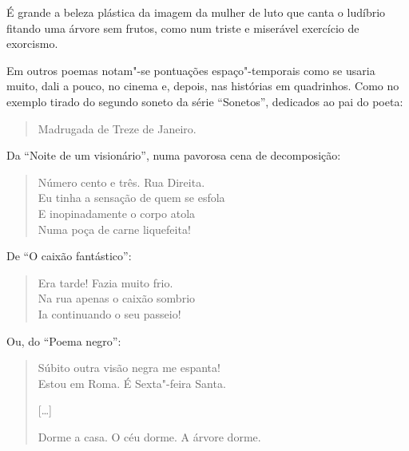 É grande a beleza plástica da imagem da mulher de luto que canta o
ludíbrio fitando uma árvore sem frutos, como num triste e miserável
exercício de exorcismo.

Em outros poemas notam"-se pontuações espaço"-temporais como se usaria muito, 
dali a pouco, no cinema e, depois, nas histórias em quadrinhos.
Como no exemplo tirado do segundo soneto da série “Sonetos”, dedicados
ao pai do poeta: 

\begin{verse}
Madrugada de Treze de Janeiro.
\end{verse}

Da “Noite de um visionário”, numa pavorosa cena de decomposição:

\begin{verse}
Número cento e três. Rua Direita.\\
Eu tinha a sensação de quem se esfola\\
E inopinadamente o corpo atola\\
Numa poça de carne liquefeita!
\end{verse}

De “O caixão fantástico”:

\begin{verse}
Era tarde! Fazia muito frio.\\
Na rua apenas o caixão sombrio\\
Ia continuando o seu passeio!
\end{verse}

Ou, do “Poema negro”:

\begin{verse}
Súbito outra visão negra me espanta!\\
Estou em Roma. É Sexta"-feira Santa.

[\ldots{}]

Dorme a casa. O céu dorme. A árvore dorme.
\end{verse}

\asterisc

